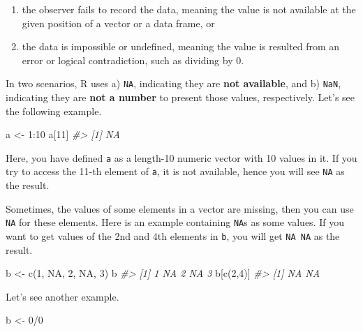 \documentclass[
]{book}
\newenvironment{Shaded}{\begin{snugshade}}{\end{snugshade}}
\newcommand{\CommentTok}[1]{\textcolor[rgb]{0.56,0.35,0.01}{\textit{#1}}}
\newcommand{\ConstantTok}[1]{\textcolor[rgb]{0.00,0.00,0.00}{#1}}
\newcommand{\DecValTok}[1]{\textcolor[rgb]{0.00,0.00,0.81}{#1}}
\newcommand{\FunctionTok}[1]{\textcolor[rgb]{0.00,0.00,0.00}{#1}}
\newcommand{\NormalTok}[1]{#1}
\newcommand{\OtherTok}[1]{\textcolor[rgb]{0.56,0.35,0.01}{#1}}
\newcommand{\SpecialCharTok}[1]{\textcolor[rgb]{0.00,0.00,0.00}{#1}}
\providecommand{\tightlist}{%
  \setlength{\itemsep}{0pt}\setlength{\parskip}{0pt}}
\begin{document}
\begin{enumerate}
\def\labelenumi{\alph{enumi})}
\tightlist
\item
  the observer fails to record the data, meaning the value is not available at the given position of a vector or a data frame, or
\item
  the data is impossible or undefined, meaning the value is resulted from an error or logical contradiction, such as dividing by 0.
\end{enumerate}

In two scenarios, R uses a) \texttt{NA}, indicating they are \textbf{not available}, and b) \texttt{NaN}, indicating they are \textbf{not a number} to present those values, respectively. Let's see the following example.

\begin{Shaded}
\begin{Highlighting}[]
\NormalTok{a }\OtherTok{\textless{}{-}} \DecValTok{1}\SpecialCharTok{:}\DecValTok{10}
\NormalTok{a[}\DecValTok{11}\NormalTok{]}
\CommentTok{\#\textgreater{} [1] NA}
\end{Highlighting}
\end{Shaded}

Here, you have defined \texttt{a} as a length-10 numeric vector with 10 values in it. If you try to access the 11-th element of \texttt{a}, it is not available, hence you will see \texttt{NA} as the result.

Sometimes, the values of some elements in a vector are missing, then you can use \texttt{NA} for these elements. Here is an example containing \texttt{NA}s as some values. If you want to get values of the 2nd and 4th elements in \texttt{b}, you will get \texttt{NA\ NA} as the result.

\begin{Shaded}
\begin{Highlighting}[]
\NormalTok{b }\OtherTok{\textless{}{-}} \FunctionTok{c}\NormalTok{(}\DecValTok{1}\NormalTok{, }\ConstantTok{NA}\NormalTok{, }\DecValTok{2}\NormalTok{, }\ConstantTok{NA}\NormalTok{, }\DecValTok{3}\NormalTok{)}
\NormalTok{b}
\CommentTok{\#\textgreater{} [1]  1 NA  2 NA  3}
\NormalTok{b[}\FunctionTok{c}\NormalTok{(}\DecValTok{2}\NormalTok{,}\DecValTok{4}\NormalTok{)]}
\CommentTok{\#\textgreater{} [1] NA NA}
\end{Highlighting}
\end{Shaded}

Let's see another example.

\begin{Shaded}
\begin{Highlighting}[]
\NormalTok{b }\OtherTok{\textless{}{-}} \DecValTok{0}\SpecialCharTok{/}\DecValTok{0}
\end{Highlighting}
\end{Shaded}
\end{document}
